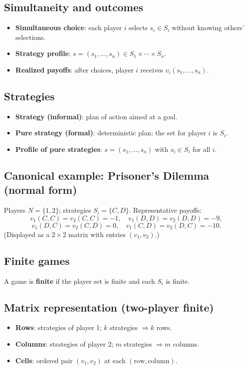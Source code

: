 \documentclass[9pt]{article}
\begin{document}
\subsection*{Simultaneity and outcomes}
\begin{itemize}
  \item \textbf{Simultaneous choice}: each player $i$ selects $s_i\in S_i$ without knowing others’ selections.
  \item \textbf{Strategy profile}: $s=(s_1,\dots,s_n)\in S_1\times\cdots\times S_n$.
  \item \textbf{Realized payoffs}: after choices, player $i$ receives $v_i(s_1,\dots,s_n)$.
\end{itemize}

\subsection*{Strategies}
\begin{itemize}
  \item \textbf{Strategy (informal)}: plan of action aimed at a goal.
  \item \textbf{Pure strategy (formal)}: deterministic plan; the set for player $i$ is $S_i$.
  \item \textbf{Profile of pure strategies}: $s=(s_1,\dots,s_n)$ with $s_i\in S_i$ for all $i$.
\end{itemize}

\subsection*{Canonical example: Prisoner’s Dilemma (normal form)}
Players $N=\{1,2\}$; strategies $S_i=\{C,D\}$.
Representative payoffs:
\[
v_1(C,C)=v_2(C,C)=-1,\quad
v_1(D,D)=v_2(D,D)=-9,
\]
\[
v_1(D,C)=v_2(C,D)=0,\quad
v_1(C,D)=v_2(D,C)=-10.
\]
(Displayed as a $2\times2$ matrix with entries $(v_1,v_2)$.)

\subsection*{Finite games}
A game is \textbf{finite} if the player set is finite and each $S_i$ is finite.

\subsection*{Matrix representation (two-player finite)}
\begin{itemize}
  \item \textbf{Rows}: strategies of player 1; $k$ strategies $\Rightarrow k$ rows.
  \item \textbf{Columns}: strategies of player 2; $m$ strategies $\Rightarrow m$ columns.
  \item \textbf{Cells}: ordered pair $(v_1,v_2)$ at each $(\text{row},\text{column})$.
\end{itemize}
\end{document}
